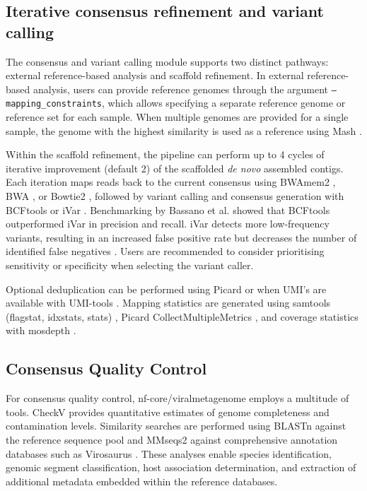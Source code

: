\subsection{Iterative consensus refinement and variant calling}

The consensus and variant calling module supports two distinct pathways: external reference-based analysis and scaffold refinement. In external reference-based analysis, users can provide reference genomes through the argument \texttt{--mapping\_constraints}, which allows specifying a separate reference genome or reference set for each sample. When multiple genomes are provided for a single sample, the genome with the highest similarity is used as a reference using Mash \cite{Ondov2019-bo}.

Within the scaffold refinement, the pipeline can perform up to 4 cycles of iterative improvement (default 2) of the scaffolded \textit{de novo} assembled contigs. Each iteration maps reads back to the current consensus using BWAmem2 \cite{Vasimuddin2019-rb}, BWA \cite{Li2013-pp}, or Bowtie2 \cite{Langmead2019-wx}, followed by variant calling and consensus generation with BCFtools \cite{Danecek2021-je} or iVar \cite{Grubaugh2019-xd}. Benchmarking by Bassano et al. \cite{Bassano2022-cl} showed that BCFtools outperformed iVar in precision and recall. iVar detects more low-frequency variants, resulting in an increased false positive rate but decreases the number of identified false negatives \cite{Bassano2022-cl}. Users are recommended to consider prioritising sensitivity or specificity when selecting the variant caller.

Optional deduplication can be performed using Picard or when UMI’s are available with UMI-tools \cite{Smith2017-nk}. Mapping statistics are generated using samtools (flagstat, idxstats, stats) \cite{Danecek2021-je}, Picard CollectMultipleMetrics \cite{Broad-Institute2019-rv}, and coverage statistics with mosdepth \cite{Pedersen2018-mu}.

\subsection{Consensus Quality Control}

For consensus quality control, nf-core/viralmetagenome employs a multitude of tools. CheckV \cite{Nayfach2021-wl} provides quantitative estimates of genome completeness and contamination levels. Similarity searches are performed using BLASTn \cite{Altschul1990-sy} against the reference sequence pool and MMseqs2 \cite{Steinegger2017-ci} against comprehensive annotation databases such as Virosaurus \cite{Gleizes2020-rq}. These analyses enable species identification, genomic segment classification, host association determination, and extraction of additional metadata embedded within the reference databases.

